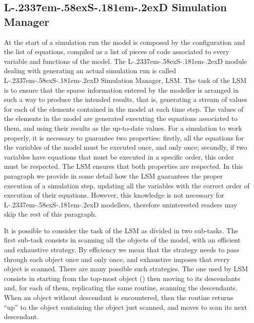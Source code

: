\documentclass [11pt,a4paper] {book}
\def\LsD{{L\kern-.2337em\lower-.58ex\hbox{S}\kern-.181em\lower-.2ex\hbox{D}}\xspace}
\begin{document}
\subsection{\LsD Simulation Manager}

At the start of a simulation run the model is composed by the configuration and the list of equations, compiled as a list of pieces of code associated to every variable and functions of the model. The \LsD module dealing with generating an actual simulation run is called \LsD Simulation Manager, LSM. The task of the LSM is to ensure that the sparse information entered by the modeller is arranged in such a way to produce the intended results, that is, generating a stream of values for each of the elements contained in the model at each time step. The values of the elements in the model are generated executing the equations associated to them, and using their results as the up-to-date values. For a simulation to work properly, it is necessary to guarantee two properties: firstly, all the equations for the variables of the model must be executed once, and only once; secondly, if two variables have equations that must be executed in a specific order, this order must be respected. The LSM ensures that both properties are respected. In this paragraph we provide in some detail how the LSM guarantees the proper execution of a simulation step, updating all the variables with the correct order of execution of their equations. However, this knowledge is not necessary for \LsD modellers, therefore uninterested readers may skip the rest of this paragraph.

It is possible to consider the task of the LSM as divided in two sub-tasks. The first sub-task consists in scanning all the objects of the model, with an efficient and exhaustive strategy. By efficiency we mean that the strategy needs to pass through each object once and only once, and exhaustive imposes that every object is scanned. There are many possible such strategies. The one used by LSM consists in starting from the top-most object () then moving to its descendants and, for each of them, replicating the same routine, scanning the descendants. When an object without descendant is encountered, then the routine returns ``up'' to the object containing the object just scanned, and moves to scan its next descendant. 
\end{document}
